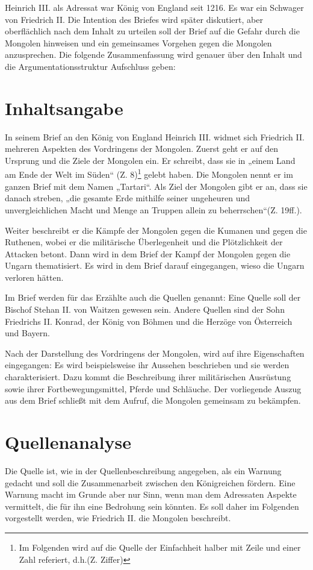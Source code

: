 \documentclass[12pt,headsepline,a4paper]{scrartcl}
\begin{document}
Heinrich III. als Adressat war König von England seit 1216. Es war ein Schwager
von Friedrich II. Die Intention des Briefes wird später diskutiert, aber
oberflächlich nach dem Inhalt zu urteilen soll der Brief auf die Gefahr durch die
Mongolen hinweisen und ein gemeinsames Vorgehen gegen die Mongolen
anzusprechen. Die folgende Zusammenfassung wird genauer über den Inhalt und die
Argumentationsstruktur Aufschluss geben:

\section{Inhaltsangabe}
In seinem Brief an den König von England Heinrich III. widmet sich Friedrich II.
mehreren Aspekten des Vordringens der Mongolen. Zuerst geht er auf den Ursprung und
die Ziele der Mongolen ein. Er schreibt, dass sie in „einem Land am Ende der Welt im
Süden“ (Z. 8)\footnote{Im Folgenden wird auf die Quelle der Einfachheit halber mit Zeile und einer Zahl referiert, d.h.(Z.
Ziffer)} gelebt haben. Die Mongolen nennt er im ganzen Brief mit dem Namen
„Tartari“. Als Ziel der Mongolen gibt er an, dass sie danach streben, „die gesamte Erde mithilfe
seiner ungeheuren und unvergleichlichen Macht und Menge an Truppen allein zu
beherrschen“(Z. 19ff.).

Weiter beschreibt er die Kämpfe der Mongolen gegen die Kumanen und gegen die
Ruthenen, wobei er die militärische Überlegenheit und die Plötzlichkeit der Attacken
betont. Dann wird in dem Brief der Kampf der Mongolen gegen die Ungarn
thematisiert. Es wird in dem Brief darauf eingegangen, wieso die Ungarn verloren
hätten.

Im Brief werden für das Erzählte auch die Quellen genannt: Eine Quelle soll der
Bischof Stehan II. von Waitzen gewesen sein. Andere Quellen sind der Sohn Friedrichs
II. Konrad, der König von Böhmen und die Herzöge von Österreich und Bayern.

Nach der Darstellung des Vordringens der Mongolen, wird auf ihre Eigenschaften
eingegangen: Es wird beispielsweise ihr Aussehen beschrieben und sie werden
charakterisiert. Dazu kommt die Beschreibung ihrer militärischen Ausrüstung sowie
ihrer Fortbewegungsmittel, Pferde und Schläuche. Der vorliegende Auszug aus dem
Brief schließt mit dem Aufruf, die Mongolen gemeinsam zu bekämpfen.

\section{Quellenanalyse}
Die Quelle ist, wie in der Quellenbeschreibung angegeben, als ein Warnung gedacht
und soll die Zusammenarbeit zwischen den Königreichen fördern. Eine Warnung macht
im Grunde aber nur Sinn, wenn man dem Adressaten Aspekte vermittelt, die für ihn eine
Bedrohung sein könnten. Es soll daher im Folgenden vorgestellt werden, wie Friedrich
II. die Mongolen beschreibt.
\end{document}

